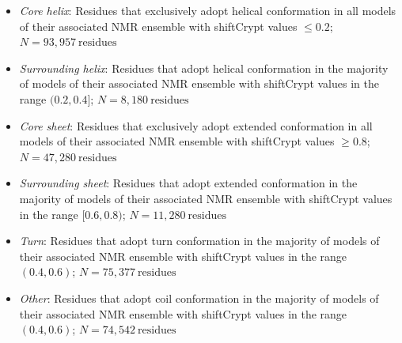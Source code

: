 \begin{itemize} %
  \item \textit{Core helix}: Residues that exclusively adopt helical conformation in all models of their associated NMR ensemble with shiftCrypt values $\le 0.2$; $N = 93,957 \:\text{residues}$
  \item \textit{Surrounding helix}: Residues that adopt helical conformation in the majority of models of their associated NMR ensemble with shiftCrypt values in the range $(0.2, 0.4]$; $N = 8,180 \:\text{residues}$
    \item \textit{Core sheet}: Residues that exclusively adopt extended conformation in all models of their associated NMR ensemble with shiftCrypt values $\ge 0.8$; $N = 47,280 \:\text{residues}$
  \item \textit{Surrounding sheet}: Residues that adopt extended conformation in the majority of models of their associated NMR ensemble with shiftCrypt values in the range $[0.6, 0.8)$; $N = 11,280 \:\text{residues}$
  \item \textit{Turn}: Residues that adopt turn conformation in the majority of models of their associated NMR ensemble with shiftCrypt values in the range $(0.4, 0.6)$; $N = 75,377 \:\text{residues}$
  \item \textit{Other}: Residues that  adopt coil conformation in the majority of models of their associated NMR ensemble with shiftCrypt values in the range $(0.4, 0.6)$; $N = 74,542 \:\text{residues}$
\end{itemize}










